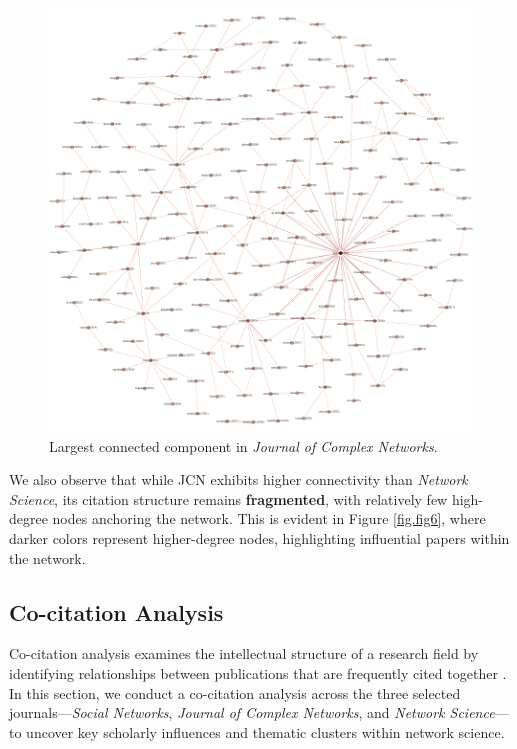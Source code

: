 \documentclass[twocolumn]{article}
\begin{document}
	\begin{figure}[htbp]
		\centering
		\includegraphics[width=\columnwidth]{"Journal of Complex Networks/Gephi/largest_component.pdf"}
		\caption{Largest connected component in \textit{Journal of Complex Networks}.}
		\label{fig.fig7}
	\end{figure}
	
	We also observe that while JCN exhibits higher connectivity than \textit{Network Science}, its citation structure remains \textbf{fragmented}, with relatively few high-degree nodes anchoring the network. This is evident in Figure \ref{fig.fig6}, where darker colors represent higher-degree nodes, highlighting influential papers within the network.
	
	\subsection{Co-citation Analysis}
	
	Co-citation analysis examines the intellectual structure of a research field by identifying relationships between publications that are frequently cited together \cite{Small1973}. In this section, we conduct a co-citation analysis across the three selected journals—\textit{Social Networks}, \textit{Journal of Complex Networks}, and \textit{Network Science}—to uncover key scholarly influences and thematic clusters within network science.
	
\end{document}
